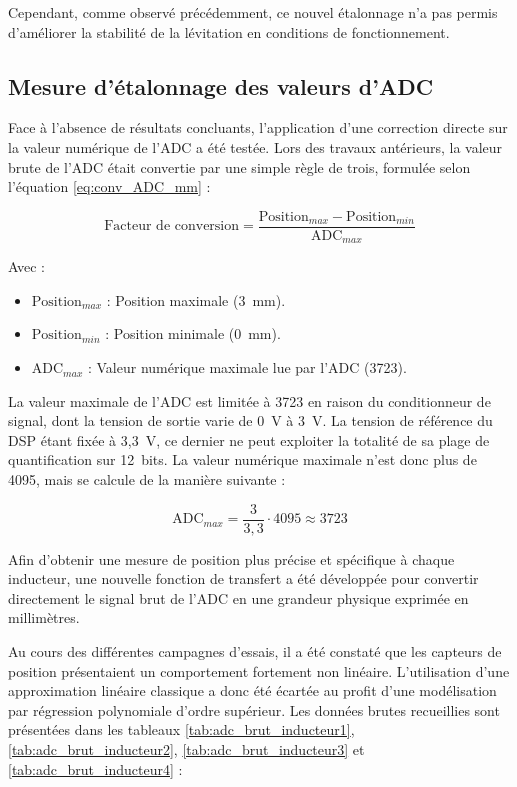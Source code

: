 Cependant, comme observé précédemment, ce nouvel étalonnage n'a pas permis d'améliorer la stabilité de la lévitation en conditions de fonctionnement.

\subsection{Mesure d'étalonnage des valeurs d'ADC}
Face à l'absence de résultats concluants, l'application d'une correction directe sur la valeur numérique de l'ADC a été testée. Lors des travaux antérieurs, la valeur brute de l'ADC était convertie par une simple règle de trois, formulée selon l'équation \ref{eq:conv_ADC_mm} :

\begin{equation}
    \text{Facteur de conversion} = \frac{\text{Position}_{max} - \text{Position}_{min}}{\text{ADC}_{max}}
    \label{eq:conv_ADC_mm}
\end{equation}

Avec :
\begin{itemize}
    \item $\text{Position}_{max}$ : Position maximale (3~mm).
    \item $\text{Position}_{min}$ : Position minimale (0~mm).
    \item $\text{ADC}_{max}$ : Valeur numérique maximale lue par l'ADC (3723).
\end{itemize}

La valeur maximale de l'ADC est limitée à 3723 en raison du conditionneur de signal, dont la tension de sortie varie de 0~V à 3~V. La tension de référence du DSP étant fixée à 3,3~V, ce dernier ne peut exploiter la totalité de sa plage de quantification sur 12~bits. La valeur numérique maximale n'est donc plus de 4095, mais se calcule de la manière suivante :

\begin{equation}
    \text{ADC}_{max} = \frac{3}{3,3}\cdot 4095 \approx 3723
\end{equation}

Afin d'obtenir une mesure de position plus précise et spécifique à chaque inducteur, une nouvelle fonction de transfert a été développée pour convertir directement le signal brut de l'ADC en une grandeur physique exprimée en millimètres.

Au cours des différentes campagnes d'essais, il a été constaté que les capteurs de position présentaient un comportement fortement non linéaire. L'utilisation d'une approximation linéaire classique a donc été écartée au profit d'une modélisation par régression polynomiale d'ordre supérieur. Les données brutes recueillies sont présentées dans les tableaux \ref{tab:adc_brut_inducteur1}, \ref{tab:adc_brut_inducteur2}, \ref{tab:adc_brut_inducteur3} et \ref{tab:adc_brut_inducteur4} :

